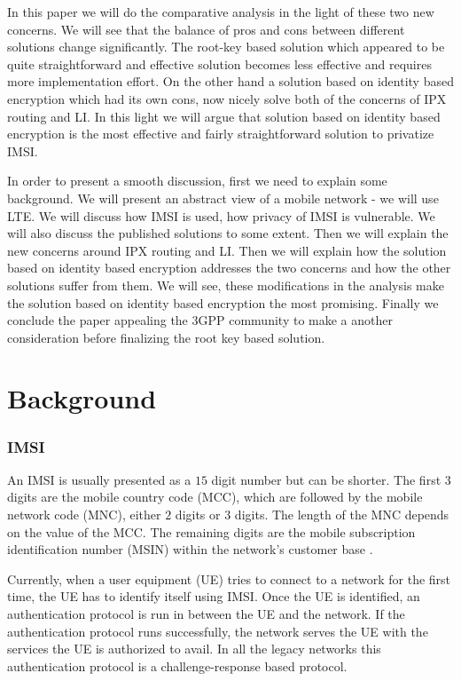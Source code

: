\documentclass[conference]{IEEEtran}
\begin{document}
In this paper we will do the comparative analysis in the light of these two new concerns. We will see that the balance of pros and cons between different solutions change significantly. The root-key based solution which appeared to be quite straightforward and effective solution becomes less effective and requires more implementation effort. On the other hand a solution based on identity based encryption which had its own cons, now nicely solve both of the concerns of IPX routing and LI. In this light we will argue that solution based on identity based encryption is the most effective and fairly straightforward solution to privatize IMSI.

In order to present a smooth discussion, first we need to explain some background. We will present an abstract view of a mobile network - we will use LTE. We will discuss how IMSI is used, how privacy of IMSI is vulnerable. We will also discuss the published solutions to some extent. Then we will explain the new concerns around IPX routing and LI. Then we will explain how the solution based on identity based encryption addresses the two concerns and how the other solutions suffer from them. We will see, these modifications in the analysis make the solution based on identity based encryption the most promising. Finally we conclude the paper appealing the 3GPP community to make a another consideration before finalizing the root key based solution.


\section{Background} \label{background}
\subsubsection{IMSI}
An IMSI is usually presented as a $15$ digit number but can be shorter. The first $3$ digits are the mobile country code (MCC), which are followed by the mobile network code (MNC), either $2$ digits or $3$ digits. The length of the MNC depends on the value of the MCC. The remaining digits are the mobile subscription identification number (MSIN) within the network's customer base \cite{TS23003}. 

Currently, when a user equipment (UE) tries to connect to a network for the first time, the UE has to identify itself using IMSI. Once the UE is identified, an authentication protocol is run in between the UE and the network. If the authentication protocol runs successfully, the network serves the UE with the services the UE is authorized to avail. In all the legacy networks this authentication protocol is a challenge-response based protocol. 
\end{document}
